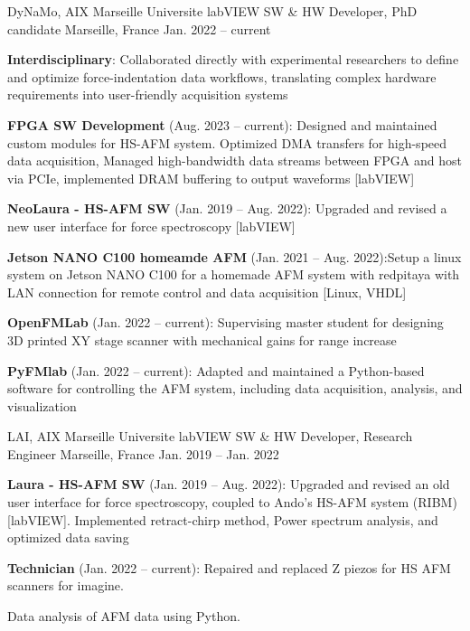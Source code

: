 
\begin{cventries}

  \cventry
    {DyNaMo, AIX Marseille Universite}
    {labVIEW SW \& HW Developer, PhD candidate}
    {Marseille, France}
    {Jan. 2022 -- current}
    {
      \begin{cvitems}
        \item {\textbf{Interdisciplinary}: Collaborated directly with experimental researchers to define and optimize force-indentation data workflows, translating complex hardware requirements into user-friendly acquisition systems}
        \item{\textbf{FPGA SW Development} (Aug. 2023 -- current): Designed and maintained custom modules for HS-AFM system. Optimized DMA transfers for high-speed data acquisition, Managed high-bandwidth data streams between FPGA and host via PCIe, implemented DRAM buffering to output waveforms [labVIEW]}
        \item{\textbf{NeoLaura - HS-AFM SW} (Jan. 2019 -- Aug. 2022): Upgraded and revised a new user interface for force spectroscopy [labVIEW]}
        \item {\textbf{Jetson NANO C100 homeamde AFM} (Jan. 2021 -- Aug. 2022):Setup a linux system on Jetson NANO C100 for a homemade AFM system with redpitaya with LAN connection for remote control and data acquisition [Linux, VHDL]}
        \item {\textbf{OpenFMLab} (Jan. 2022 -- current): Supervising master student for designing 3D printed XY stage scanner with mechanical gains for range increase}
        \item {\textbf{PyFMlab} (Jan. 2022 -- current): Adapted and maintained a Python-based software for controlling the AFM system, including data acquisition, analysis, and visualization}
      \end{cvitems}
      \vspace{1em}
    }

  \cventry
    {LAI, AIX Marseille Universite}
    {labVIEW SW \& HW Developer, Research Engineer}
    {Marseille, France}
    {Jan. 2019 -- Jan. 2022}
    {
      \begin{cvitems}
        \item{\textbf{Laura - HS-AFM SW} (Jan. 2019 -- Aug. 2022): Upgraded and revised an old user interface for force spectroscopy, coupled to Ando's HS-AFM system (RIBM) [labVIEW]. Implemented retract-chirp method, Power spectrum analysis, and optimized data saving}
        \item {\textbf{Technician} (Jan. 2022 -- current): Repaired and replaced Z piezos for HS AFM scanners for imagine.}
        \item Data analysis of AFM data using Python.
      \end{cvitems}
      \vspace{1em}
    }


\end{cventries}
